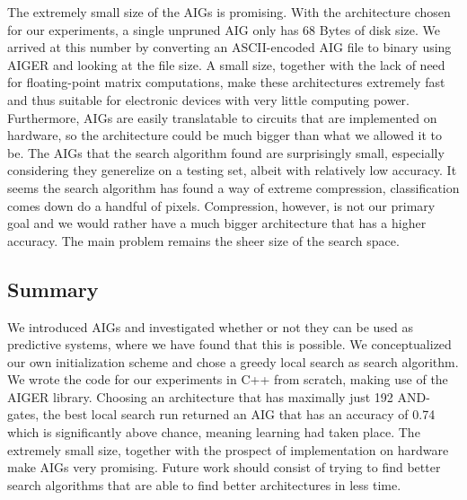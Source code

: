 The extremely small size of the AIGs is promising. With the architecture chosen for our experiments, a single unpruned AIG only has 68 Bytes of disk size. We arrived at this number by converting an ASCII-encoded AIG file to binary using AIGER and looking at the file size. A small size, together with the lack of need for floating-point matrix computations, make these architectures extremely fast and thus suitable for electronic devices with very little computing power. Furthermore, AIGs are easily translatable to circuits that are implemented on hardware, so the architecture could be much bigger than what we allowed it to be. The AIGs that the search algorithm found are surprisingly small, especially considering they generelize on a testing set, albeit with relatively low accuracy. It seems the search algorithm has found a way of extreme compression, classification comes down do a handful of pixels. Compression, however, is not our primary goal and we would rather have a much bigger architecture that has a higher accuracy. The main problem remains the sheer size of the search space.

\subsection{Summary}
We introduced AIGs and investigated whether or not they can be used as predictive systems, where we have found that this is possible. We conceptualized our own initialization scheme and chose a greedy local search as search algorithm. We wrote the code for our experiments in C++ from scratch, making use of the AIGER library. Choosing an architecture that has maximally just 192 AND-gates, the best local search run returned an AIG that has an accuracy of 0.74 which is significantly above chance, meaning learning had taken place. The extremely small size, together with the prospect of implementation on hardware make AIGs very promising. Future work should consist of trying to find better search algorithms that are able to find better architectures in less time.
